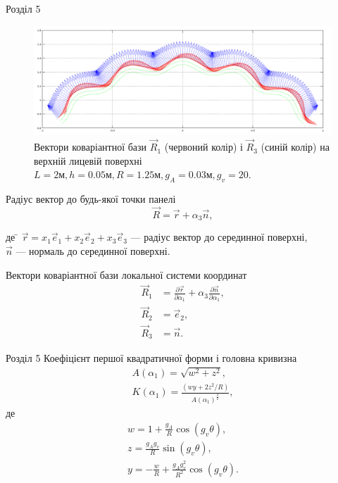 \documentclass[8pt]{beamer}
\numberwithin{figure}{section}
\numberwithin{equation}{section}
\numberwithin{table}{section}
\begin{document}
\begin{frame}{Розділ 5}
\begin{figure}
	\includegraphics[scale=0.2]{pic/cor_R1R32.png}
		\caption{Вектори коваріантної бази $\vec{R}_1$ (червоний колір) і $\vec{R}_3$ (синій колір) на верхній лицевій поверхні $L=2\text{м}, h=0.05\text{м},R=1.25\text{м},g_A=0.03\text{м}, g_v=20$.}
\end{figure}

Радіус вектор до будь-якої точки панелі
\begin{equation}
\vec{R}=\vec{r}+\alpha_3\vec{n},
\end{equation}
\begin{tabbing}
де \= $\vec{r} = x_1\vec{e}_1+x_2\vec{e}_2+x_3\vec{e}_3$ --- радіус вектор до серединної поверхні,\\
\> $\vec{n}$ --- нормаль до серединної поверхні.
\end{tabbing}

Вектори коваріантної бази локальної системи координат
\begin{align}
\vec{R}_1&=\frac{\partial \vec{r}}{\partial \alpha_1}+\alpha_3\frac{\partial \vec{n}}{\partial \alpha_1},\\
\vec{R}_2 &= \vec{e}_2,\\
\vec{R}_3 &= \vec{n}.
\end{align}

\end{frame}

\begin{frame}{Розділ 5}
Коефіцієнт першої квадратичної форми і головна кривизна
\begin{gather}
A\left(\alpha_1\right) = \sqrt{w^2+z^2},\\
K\left(\alpha_1\right) = \frac{\left(wy+2z^2/R\right)}{A\left(\alpha_1\right)^{\frac{3}{2}}},
\end{gather}
де
\begin{gather*}
w=1+\frac{g_A}{R}\cos\left(g_v\theta\right),\\
z=\frac{g_A g_v}{R}\sin\left(g_v\theta\right),\\
y=-\frac{w}{R}+\frac{g_A g_v^2}{R^2}\cos\left(g_v\theta\right).
\end{gather*}

\end{frame}
\end{document}

